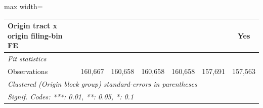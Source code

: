 \documentclass[
  11pt,
]{article}
\begin{document}
\begin{adjustbox}{max width=\textwidth}
\begin{tabular}{lcccccc}
   Origin tract x origin filing-bin FE            &                        &                &                       &                &                & Yes\\  
   \midrule
   \emph{Fit statistics}\\
   Observations                                   & 160,667                & 160,658        & 160,658               & 160,658        & 157,691        & 157,563\\  
   \midrule \midrule
   \multicolumn{7}{l}{\emph{Clustered (Origin block group) standard-errors in parentheses}}\\
   \multicolumn{7}{l}{\emph{Signif. Codes: ***: 0.01, **: 0.05, *: 0.1}}\\
\end{tabular}
\par\endgroup

\end{adjustbox}
\end{document}
